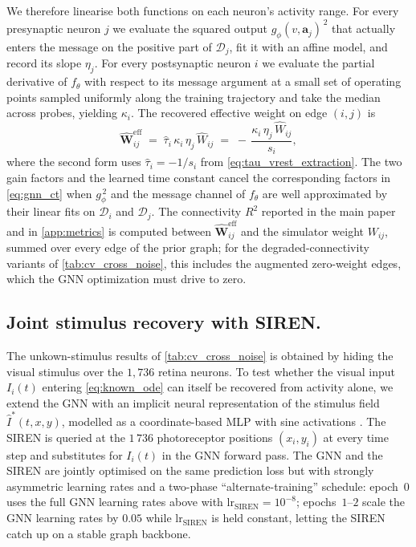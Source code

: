\documentclass{article}
\begin{document}
{We therefore linearise both functions on each neuron's activity
range. For every presynaptic neuron $j$ we evaluate the squared
output $g_\phi(v,\mathbf{a}_j)^{\,2}$ that actually enters the
message on the positive part of $\mathcal{D}_j$, fit it with an
affine model, and record its slope $\eta_j$. For every postsynaptic
neuron $i$ we evaluate the partial derivative of $f_\theta$ with
respect to its message argument at a small set of operating points
sampled uniformly along the training trajectory and take the
median across probes, yielding $\kappa_i$. The recovered effective
weight on edge $(i,j)$ is
\begin{equation}
    \hat{\mathbf{W}}^{\mathrm{eff}}_{ij}
    \;=\;
    \hat{\tau}_i\,\kappa_i\,\eta_j\,\hat{W}_{ij}
    \;=\;
    -\,\frac{\kappa_i\,\eta_j\,\hat{W}_{ij}}{s_i},
    \label{eq:weight_extraction}
\end{equation}
where the second form uses $\hat\tau_i = -1/s_i$ from
\cref{eq:tau_vrest_extraction}. The two gain factors and the
learned time constant cancel the corresponding factors in
\cref{eq:gnn_ct} when $g_\phi^{\,2}$ and the message channel of
$f_\theta$ are well approximated by their linear fits on
$\mathcal{D}_i$ and $\mathcal{D}_j$. The connectivity $R^2$
reported in the main paper and in \cref{app:metrics} is
computed between $\hat{\mathbf{W}}^{\mathrm{eff}}_{ij}$ and the simulator
weight $W_{ij}$, summed over every edge of the prior
graph; for the degraded-connectivity variants of
\cref{tab:cv_cross_noise}, this includes the augmented
zero-weight edges, which the GNN optimization must drive to zero.
}%

\subsection{Joint stimulus recovery with SIREN.}
\label{app:SIREN}
The unkown-stimulus results of \cref{tab:cv_cross_noise} is obtained by hiding the visual stimulus over the $1{,}736$ retina neurons. To test whether the visual input $I_i(t)$ entering \cref{eq:known_ode} can itself be recovered from activity alone, we extend the GNN with an implicit neural representation of the stimulus field $\hat I^*(t,x,y)$, modelled as a coordinate-based
MLP with sine activations \citep[SIREN,][input size~$=3$,
hidden dimension~$=2048$, $4$ hidden layers, output size~$=1$,
$\omega_0\!=\!4096$, outermost-linear head]{sitzmann_implicit_2020}.
The SIREN is queried at the $1\,736$ photoreceptor positions
$(x_i,y_i)$ at every time step and substitutes for $I_i(t)$ in the
GNN forward pass. The GNN and the SIREN are jointly optimised on the
same prediction loss but with strongly asymmetric learning rates
and a two-phase ``alternate-training'' schedule: epoch~$0$ uses the
full GNN learning rates above with
$\text{lr}_\text{SIREN}\!=\!10^{-8}$; epochs~$1$–$2$ scale the GNN
learning rates by $0.05$ while $\text{lr}_\text{SIREN}$ is held
constant, letting the SIREN catch up on a stable graph backbone.
\end{document}
